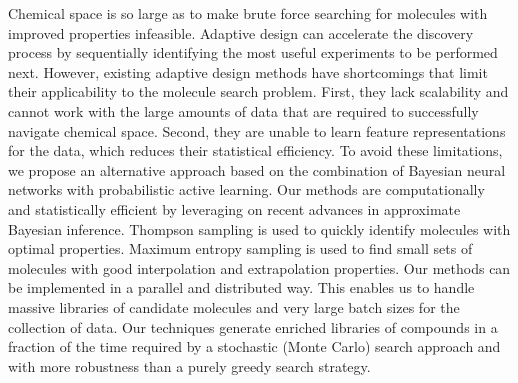 
Chemical space is so large as to make brute force searching for molecules with
improved properties infeasible. Adaptive design can accelerate the discovery
process by sequentially identifying the most useful experiments to be performed
next. However, existing adaptive design methods have shortcomings that limit
their applicability to the molecule search problem. First, they lack
scalability and cannot work with the large amounts of data that are required to
successfully navigate chemical space. Second, they are unable to learn feature
representations for the data, which reduces their statistical efficiency. To
avoid these limitations, we propose an alternative approach based on the
combination of Bayesian neural networks with probabilistic active learning. Our
methods are computationally and statistically efficient by leveraging on recent
advances in approximate Bayesian inference. Thompson
sampling is used to quickly identify molecules with optimal properties.
Maximum entropy sampling is used
to find small sets of molecules with good interpolation and extrapolation properties.
Our methods can be implemented in a parallel and distributed way. This enables us to handle
massive libraries of candidate molecules and very large batch sizes for the collection of data.
Our techniques generate enriched libraries of compounds in a fraction
of the time required by a stochastic (Monte Carlo) search approach and with
more robustness than a purely greedy search strategy.